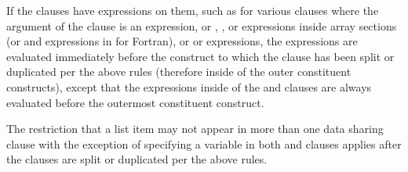 If the clauses have expressions on them, such as for various clauses where the argument of the
clause is an expression, or , , or  expressions inside array
sections (or  and  expressions in  for Fortran),
or  or  expressions, the expressions are evaluated immediately
before the construct to which the clause has been split or duplicated per the
above rules (therefore inside of the outer constituent constructs), except that the expressions inside
of the  and  clauses are always evaluated before the outermost
constituent construct.

The restriction that a list item may not appear in more than one data
sharing clause with the exception of specifying a variable in both
 and  clauses applies after the clauses
are split or duplicated per the above rules.
